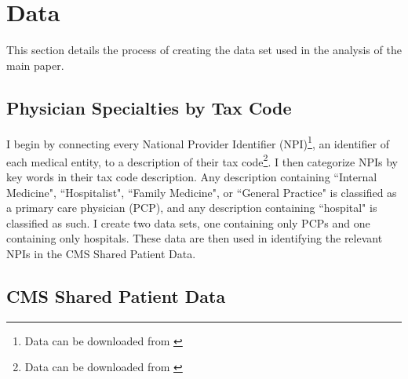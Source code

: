 \documentclass[12pt]{article}
\begin{document}
\clearpage

\renewcommand*{\bibfont}{\footnotesize}

\printbibliography

\clearpage


\appendix

\section{Data}\label{app:data}

This section details the process of creating the data set used in the analysis of the main paper. 

\subsection{Physician Specialties by Tax Code}\label{sec:taxcode}

I begin by connecting every National Provider Identifier (NPI)\footnote{Data can be downloaded from \hyperlink{https://download.cms.gov/nppes/NPI/Files.html}{}}, an identifier of each medical entity, to a description of their tax code\footnote{Data can be downloaded from \hyperlink{https://nucc.org/index.php/code-sets-mainmenu-41/provider-taxonomy-mainmenu-40/pdf-mainmenu-53}{}}. I then categorize NPIs by key words in their tax code description. Any description containing ``Internal Medicine", ``Hospitalist", ``Family Medicine", or ``General Practice" is classified as a primary care physician (PCP), and any description containing ``hospital" is classified as such. I create two data sets, one containing only PCPs and one containing only hospitals. These data are then used in identifying the relevant NPIs in the CMS Shared Patient Data. 



\subsection{CMS Shared Patient Data}\label{sec:sharedpat}
\end{document}

